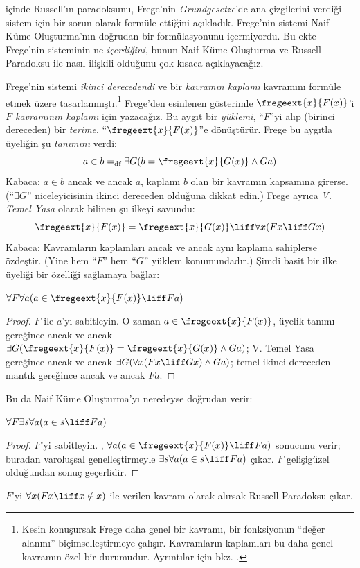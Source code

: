 \documentclass[../../../include/open-logic-section]{subfiles}
\begin{document}


 içinde Russell'ın paradoksunu, Frege'nin
\emph{Grundgesetze}'de ana çizgilerini verdiği sistem için bir sorun olarak
formüle ettiğini açıkladık. Frege'nin sistemi Naif Küme Oluşturma'nın doğrudan
bir formülasyonunu içermiyordu. Bu ekte Frege'nin sisteminin ne
\emph{içerdiğini}, bunun Naif Küme Oluşturma ve Russell Paradoksu ile nasıl
ilişkili olduğunu çok kısaca açıklayacağız.

Frege'nin sistemi \emph{ikinci derecedendi} ve bir \emph{kavramın kaplamı}
kavramını formüle etmek üzere tasarlanmıştı.\footnote{Kesin konuşursak Frege
  daha genel bir kavramı, bir fonksiyonun ``değer alanını''
  biçimselleştirmeye çalışır. Kavramların kaplamları bu daha genel kavramın
  özel bir durumudur. Ayrıntılar için bkz.
  \citet[pp.\ 8--9]{Heck2012}.} Frege'den esinlenen gösterimle
$\fregeext{x}{F(x)}$'i \emph{$F$ kavramının kaplamı} için yazacağız. Bu
aygıt bir \emph{yüklemi}, ``$F$''yi alıp (birinci dereceden) bir
\emph{terime}, ``$\fregeext{x}{F(x)}$''e dönüştürür. Frege bu aygıtla
üyeliğin şu \emph{tanımını} verdi:
\[
  a \in b =_\text{df} \exists G(b = \fregeext{x}{G(x)} \land Ga)
\]
Kabaca: $a\in b$ ancak ve ancak $a$, kaplamı $b$ olan bir kavramın kapsamına
girerse. (``$\exists G$'' niceleyicisinin ikinci dereceden olduğuna dikkat
edin.) Frege ayrıca \emph{V. Temel Yasa} olarak bilinen şu ilkeyi savundu:
$$\fregeext{x}{F(x)} = \fregeext{x}{G(x)} \liff \forall x (Fx \liff Gx)$$
Kabaca: Kavramların kaplamları ancak ve ancak aynı kaplama sahiplerse
özdeştir. (Yine hem ``$F$'' hem ``$G$'' yüklem konumundadır.) Şimdi basit bir
ilke üyeliği bir özelliği sağlamaya bağlar:

\begin{lem}
$\forall F \forall a(a \in \fregeext{x}{F(x)} \liff Fa)$
\end{lem}

\begin{proof}
$F$ ile $a$'yı sabitleyin. O zaman $a\in\fregeext{x}{F(x)}$, üyelik tanımı
gereğince ancak ve ancak
$\exists G(\fregeext{x}{F(x)}=\fregeext{x}{G(x)}\land Ga)$; V. Temel Yasa
gereğince ancak ve ancak $\exists G(\forall x(Fx\liff Gx)\land Ga)$; temel
ikinci dereceden mantık gereğince ancak ve ancak $Fa$.
\end{proof}

Bu da Naif Küme Oluşturma'yı neredeyse doğrudan verir:

\begin{lem}
$\forall F \exists s \forall a (a \in s \liff Fa)$
\end{lem}

\begin{proof}
$F$'yi sabitleyin. ,
$\forall a(a\in\fregeext{x}{F(x)}\liff Fa)$ sonucunu verir; buradan varoluşsal
genelleştirmeyle $\exists s\forall a(a\in s\liff Fa)$ çıkar. $F$ gelişigüzel
olduğundan sonuç geçerlidir.
\end{proof}

$F$'yi $\forall x(Fx\liff x\notin x)$ ile verilen kavram olarak alırsak
Russell Paradoksu çıkar.
\end{document}
